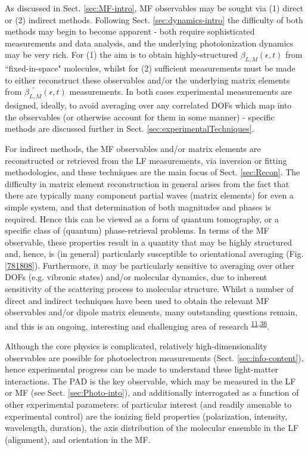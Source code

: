 \documentclass[10pt]{article}
\begin{document}
As discussed in Sect. \ref{sec:MF-intro}, MF observables may be sought via (1) direct or (2) indirect methods. Following Sect. \ref{sec:dynamics-intro} the difficulty of both methods may begin to become apparent - both require sophisticated measurements and data analysis, and the underlying photoionization dynamics may be very rich. For (1) the aim is to obtain highly-structured $\beta_{L,M}(\epsilon,t)$ from ``fixed-in-space" molecules, whilst for (2) sufficient measurements must be made to either reconstruct these observables and/or the underlying matrix elements from $\bar{\beta_{L,M}}(\epsilon,t)$ measurements. In both cases experimental measurements are designed, ideally, to avoid averaging over any correlated DOFs which map into the observables (or otherwise account for them in some manner) - specific methods are discussed further in Sect. \ref{sec:experimentalTechniques}.

For indirect methods, the MF observables and/or matrix elements are reconstructed or retrieved from the LF measurements, via inversion or fitting methodologies, and these techniques are the main focus of Sect. \ref{sec:Recon}. The difficulty in matrix element reconstruction in general arises from the fact that there are typically many component partial waves (matrix elements) for even a simple system, and that determination of both magnitudes and phases is required. Hence this can be viewed as a form of quantum tomography, or a specific class of (quantum) phase-retrieval problems. In terms of the MF observable, these properties result in a quantity that may be highly structured and, hence, is (in general) particularly susceptible to orientational averaging (Fig. \ref{781808}). Furthermore, it may be particularly sensitive to averaging over other DOFs (e.g. vibronic states) and/or molecular dynamics, due to inherent sensitivity of the scattering process to molecular structure. Whilst a number of direct and indirect techniques have been used to obtain the relevant MF observables and/or dipole matrix elements, many outstanding questions remain, and this is an ongoing, interesting and challenging area of research \textsuperscript{\hyperref[csl:11]{11},\hyperref[csl:36]{36}}.

Although the core physics is complicated, relatively high-dimensionality observables are possible for photoelectron measurements (Sect. \ref{sec:info-content}), hence experimental progress can be made to understand these light-matter interactions. The PAD is the key observable, which may be measured in the LF or MF (see Sect. \ref{sec:Photo-into}), and additionally interrogated as a function of other experimental parameters: of particular interest (and readily amenable to experimental control) are the ionizing field properties (polarization, intensity, wavelength, duration), the axis distribution of the molecular ensemble in the LF (alignment), and orientation in the MF. 
\end{document}
